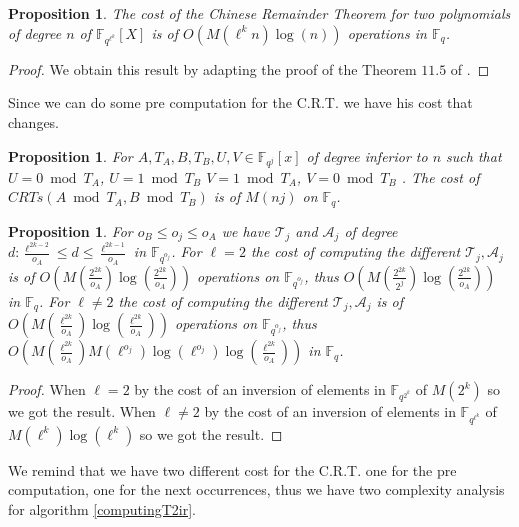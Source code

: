 \documentclass{lms}
\newtheorem{prop}[thm]{Proposition}
\begin{document}
\begin{prop}
The cost of the Chinese Remainder Theorem for two polynomials of degree $n$ of $\mathbb{F}_{q^{\ell^k}}[X] $ is of $O(M(\ell^kn)\log(n))$ operations in $\mathbb{F}_q$.
\end{prop}

\begin{proof}
We obtain this result by adapting the proof of the Theorem $11.5$ of \cite{vzGG}.
\end{proof}

Since we can do some pre computation for the C.R.T. we have his cost that changes. 

\begin{prop}
For $A, T_A,B, T_B,U,V \in \mathbb{F}_{q^{j}}[x]$ of degree inferior to $n$ such that $U=0 \bmod T_A$, $U=1 \bmod T_B$ $V=1 \bmod T_A$, $V=0 \bmod T_B$ . The cost of $CRTs(A \bmod T_A,B\bmod T_B)$ is of $M(nj)$ on $\mathbb{F}_q$.
\end{prop}

\begin{prop}
For $ o_{B} \leqslant o_j \leqslant o_{A}$ we have $\mathcal{T}_j$ and $\mathcal{A}_j$ of degree $d: \frac{\ell^{2k-2}}{o_{A}}  \leqslant d \leqslant \frac{\ell^{2k-1}}{o_{A}}$ in $\mathbb{F}_{q^{o_j}}$. 
\newline
For $\ell=2$ the cost of computing the different $\mathcal{T}_j,\mathcal{A}_j$ is of $O(M(\frac{2^{2k}}{o_{A}})\log(\frac{2^{2k}}{o_{A}}))$ operations on $\mathbb{F}_{q^{o_j}}$, thus $O(M(\frac{2^{2k}}{2^j})\log(\frac{2^{2k}}{o_{A}}))$ in $\mathbb{F}_q$.
\newline 
For $\ell \neq 2$ the cost of computing the different $\mathcal{T}_j,\mathcal{A}_j$ is of $O(M(\frac{\ell^{2k}}{o_{A}})\log(\frac{\ell^{2k}}{o_{A}}))$ operations on $\mathbb{F}_{q^{o_j}}$, thus $O(M(\frac{\ell^{2k}}{o_{A}})M(\ell^{o_j}) \log(\ell^{o_j})\log(\frac{\ell^{2k}}{o_{A}}))$ in $\mathbb{F}_q$. %
\end{prop}

\begin{proof}
When $\ell=2$ by \cite{DoSc12} the cost of an inversion of elements in $\mathbb{F}_{q^{2^k}}$ of $M(2^k)$ so we got the result. When $\ell \neq 2$ by \cite{DeDoSc13} the cost of an inversion of elements in $\mathbb{F}_{q^{\ell^k}}$ of $M(\ell^k)\log(\ell^k)$ so we got the result.
\end{proof}


We remind that we have two different cost for the C.R.T. one for the pre computation, one for the next occurrences, thus we have two complexity analysis for algorithm \ref{computingT2ir}.
\end{document}
